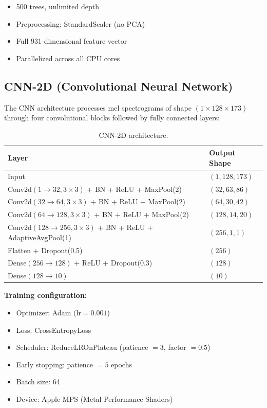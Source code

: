 \documentclass[conference]{IEEEtran}
\begin{document}
\begin{itemize}
    \item 500 trees, unlimited depth
    \item Preprocessing: StandardScaler (no PCA)
    \item Full 931-dimensional feature vector
    \item Parallelized across all CPU cores
\end{itemize}

\subsection{CNN-2D (Convolutional Neural Network)}

The CNN architecture processes mel spectrograms of shape $(1 \times 128 \times 173)$ through four convolutional blocks followed by fully connected layers:

\begin{table}[htbp]
\centering
\caption{CNN-2D architecture.}
\label{tab:cnn}
\begin{tabular}{@{}ll@{}}
\toprule
\textbf{Layer} & \textbf{Output Shape} \\
\midrule
Input                            & $(1, 128, 173)$ \\
Conv2d$(1 \to 32, 3\times3)$ + BN + ReLU + MaxPool(2) & $(32, 63, 86)$ \\
Conv2d$(32 \to 64, 3\times3)$ + BN + ReLU + MaxPool(2) & $(64, 30, 42)$ \\
Conv2d$(64 \to 128, 3\times3)$ + BN + ReLU + MaxPool(2) & $(128, 14, 20)$ \\
Conv2d$(128 \to 256, 3\times3)$ + BN + ReLU + AdaptiveAvgPool(1) & $(256, 1, 1)$ \\
Flatten + Dropout(0.5)          & $(256)$ \\
Dense$(256 \to 128)$ + ReLU + Dropout(0.3) & $(128)$ \\
Dense$(128 \to 10)$             & $(10)$ \\
\bottomrule
\end{tabular}
\end{table}

\textbf{Training configuration:}
\begin{itemize}
    \item Optimizer: Adam ($\text{lr} = 0.001$)
    \item Loss: CrossEntropyLoss
    \item Scheduler: ReduceLROnPlateau (patience $= 3$, factor $= 0.5$)
    \item Early stopping: patience $= 5$ epochs
    \item Batch size: 64
    \item Device: Apple MPS (Metal Performance Shaders)
\end{itemize}
\end{document}
